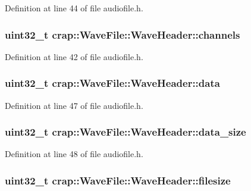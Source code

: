 Definition at line 44 of file audiofile.\+h.

\hypertarget{structcrap_1_1_wave_file_1_1_wave_header_a8b7a99f75e7053e7de41704a531af9fb}{
\subsubsection[{channels}]{\setlength{\rightskip}{0pt plus 5cm}uint32\+\_\+t crap\+::\+Wave\+File\+::\+Wave\+Header\+::channels}}\label{structcrap_1_1_wave_file_1_1_wave_header_a8b7a99f75e7053e7de41704a531af9fb}


Definition at line 42 of file audiofile.\+h.

\hypertarget{structcrap_1_1_wave_file_1_1_wave_header_af483dcde797314d2a0b7ec47de0ee90c}{
\subsubsection[{data}]{\setlength{\rightskip}{0pt plus 5cm}uint32\+\_\+t crap\+::\+Wave\+File\+::\+Wave\+Header\+::data}}\label{structcrap_1_1_wave_file_1_1_wave_header_af483dcde797314d2a0b7ec47de0ee90c}


Definition at line 47 of file audiofile.\+h.

\hypertarget{structcrap_1_1_wave_file_1_1_wave_header_a10f71511e169d4e3c1f9ebffd89cf7a3}{
\subsubsection[{data\+\_\+size}]{\setlength{\rightskip}{0pt plus 5cm}uint32\+\_\+t crap\+::\+Wave\+File\+::\+Wave\+Header\+::data\+\_\+size}}\label{structcrap_1_1_wave_file_1_1_wave_header_a10f71511e169d4e3c1f9ebffd89cf7a3}


Definition at line 48 of file audiofile.\+h.

\hypertarget{structcrap_1_1_wave_file_1_1_wave_header_a66ee60f117774b2a2c89b3b5b5d7881f}{
\subsubsection[{filesize}]{\setlength{\rightskip}{0pt plus 5cm}uint32\+\_\+t crap\+::\+Wave\+File\+::\+Wave\+Header\+::filesize}}\label{structcrap_1_1_wave_file_1_1_wave_header_a66ee60f117774b2a2c89b3b5b5d7881f}


